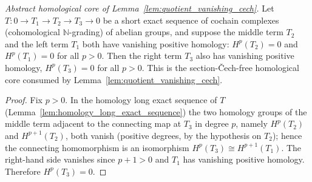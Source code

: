 \begin{lemma}

  \label{lem:cech_homology_quotient_vanishing}
  \textit{Abstract homological core of Lemma~\ref{lem:quotient_vanishing_cech}.}
  Let \(T : 0 \to T_1 \to T_2 \to T_3 \to 0\) be a short exact sequence of cochain complexes
  (cohomological \(\mathbb{N}\)-grading) of abelian groups, and suppose the middle term \(T_2\) and
  the left term \(T_1\) both have vanishing positive homology: \(H^p(T_2) = 0\) and \(H^p(T_1) = 0\)
  for all \(p > 0\). Then the right term \(T_3\) also has vanishing positive homology, \(H^p(T_3) =
  0\) for all \(p > 0\). This is the section-Čech-free homological core consumed by
  Lemma~\ref{lem:quotient_vanishing_cech}.
\end{lemma}
\begin{proof}
  \leanok
  Fix \(p > 0\). In the homology long exact sequence of \(T\)
  (Lemma~\ref{lem:homology_long_exact_sequence}) the two homology groups of the middle term
  adjacent to the connecting map at \(T_3\) in degree \(p\), namely \(H^p(T_2)\) and \(H^{p+1}(T_2)\),
  both vanish (positive degrees, by the hypothesis on \(T_2\)); hence the connecting homomorphism is
  an isomorphism \(H^p(T_3) \cong H^{p+1}(T_1)\). The right-hand side vanishes since \(p + 1 > 0\)
  and \(T_1\) has vanishing positive homology. Therefore \(H^p(T_3) = 0\).
\end{proof}

